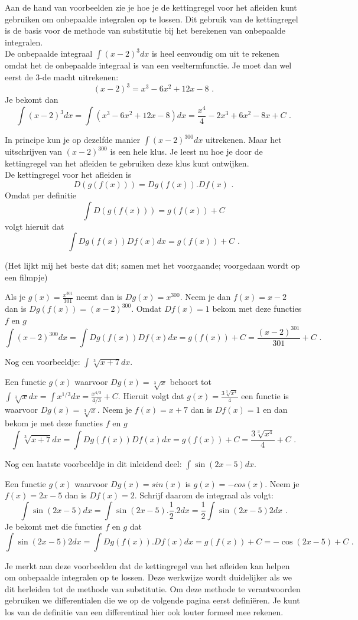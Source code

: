 \documentclass{article}
\begin{document}
Aan de hand van voorbeelden zie je hoe je de kettingregel voor het afleiden kunt gebruiken om onbepaalde integralen op te lossen.
Dit gebruik van de kettingregel is de basis voor de methode van substitutie bij het berekenen van onbepaalde integralen.\\

De onbepaalde integraal $\int (x-2)^3dx$ is heel eenvoudig om uit te rekenen omdat het de onbepaalde integraal is van een veeltermfunctie.
Je moet dan wel eerst de 3-de macht uitrekenen:
\[
(x-2)^3=x^3-6x^2+12x-8 \text { .}
\]
Je bekomt dan
\[
\int (x-2)^3dx=\int (x^3-6x^2+12x-8)dx = \frac{x^4}{4}-2x^3+6x^2-8x+C \text { .}
\]

In principe kun je op dezelfde manier $\int (x-2)^{300}dx$ uitrekenen.
Maar het uitschrijven van $(x-2)^{300}$ is een hele klus.
Je leest nu hoe je door de kettingregel van het afleiden te gebruiken deze klus kunt ontwijken.\\

De kettingregel voor het afleiden is
\[
D(g(f(x)))=Dg(f(x)).Df(x) \text { .}
\]
Omdat per definitie
\[
\int D(g(f(x)))=g(f(x))+C
\]
volgt hieruit dat
\[
\int Dg(f(x))Df(x)dx =g(f(x))+C \text { .}
\]

\noindent (Het lijkt mij het beste dat dit; samen met het voorgaande; voorgedaan wordt op een filmpje)

Als je $g(x)=\frac{x^{301}}{301}$ neemt dan is $Dg(x)=x^{300}$.
Neem je dan $f(x)=x-2$ dan is $Dg(f(x))=(x-2)^{300}$.
Omdat $Df(x)=1$ bekom met deze functies $f$ en $g$
\[
\int (x-2)^{300}dx = \int Dg(f(x))Df(x)dx = g(f(x))+C=\frac{(x-2)^{301}}{301}+C \text { .}
\]

Nog een voorbeeldje: $\int \sqrt[3]{x+7} dx$.

Een functie $g(x)$ waarvoor $Dg(x)=\sqrt[3]{x}$ behoort tot $\int \sqrt[3]{x} dx=\int x^{1/3}dx=\frac{x^{4/3}}{4/3}+C$.
Hieruit volgt dat $g(x)=\frac{3 \sqrt[3]{x^4}}{4}$ een functie is waarvoor $Dg(x)=\sqrt[3 ]{x}$.
Neem je $f(x)=x+7$ dan is $Df(x)=1$ en dan bekom je met deze functies $f$ en $g$
\[
\int \sqrt[3]{x+7}dx=\int Dg(f(x))Df(x)dx = g(f(x))+C=\frac{3\sqrt[3]{x^4}}{4}+C \text { .}
\]

Nog een laatste voorbeeldje in dit inleidend deel: $\int \sin(2x-5)dx$.

Een functie $g(x)$ waarvoor $Dg(x)=sin(x)$ is $g(x)=-cos(x)$.
Neem je $f(x)=2x-5$ dan is $Df(x)=2$.
Schrijf daarom de integraal als volgt:
\[
\int \sin(2x-5)dx=\int \sin(2x-5).\frac{1}{2}.2dx=\frac{1}{2} \int \sin(2x-5)2dx \text { .}
\]
Je bekomt met die functies $f$ en $g$ dat
\[
\int \sin(2x-5)2dx = \int Dg(f(x)).Df(x)dx=g(f(x))+C=-\cos(2x-5)+C \text { .}
\]
\vspace{2mm}

Je merkt aan deze voorbeelden dat de kettingregel van het afleiden kan helpen om onbepaalde integralen op te lossen.
Deze werkwijze wordt duidelijker als we dit herleiden tot de methode van substitutie.
Om deze methode te verantwoorden gebruiken we differentialen die we op de volgende pagina eerst defini\"eren.
Je kunt los van de definitie van een differentiaal hier ook louter formeel mee rekenen.
\end{document}
